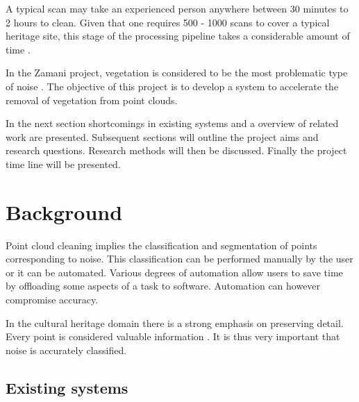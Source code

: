 \documentclass[10pt,twocolumn]{article}
\begin{document}
A typical scan may take an experienced person anywhere between 30 minutes to 2 hours to clean. Given that one requires 500 - 1000 scans to cover a typical heritage site, this stage of the processing pipeline takes a considerable amount of time \cite{Ruther2011}.

In the Zamani project, vegetation is considered to be the most problematic type of noise \cite{Held2012}. The objective of this project is to develop a system to accelerate the removal of vegetation from point clouds.

In the next section shortcomings in existing systems and a overview of related work are presented. Subsequent sections will outline the project aims and research questions. Research methods will then be discussed. Finally the project time line will be presented.

\section{Background}

Point cloud cleaning implies the classification and segmentation of points corresponding to noise. This classification can be performed manually by the user or it can be automated. Various degrees of automation allow users to save time by offloading some aspects of a task to software. Automation can however compromise accuracy.

In the cultural heritage domain there is a strong emphasis on preserving detail. Every point is considered valuable information \cite{Held2012}. It is thus very important that noise is accurately classified.

\subsection{Existing systems}
\end{document}
